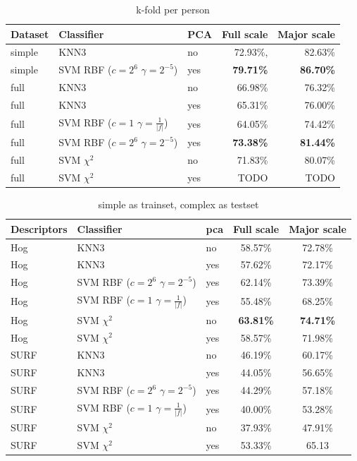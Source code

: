 \begin{table}
\centering
\begin{tabular}{lllrr}
\hline\hline
Dataset & Classifier & PCA	& Full scale	& Major scale \\
\hline
simple	& KNN3	&	no	& 72.93\%, & 82.63\% \\
simple	& SVM RBF ($c=2^6$ $\gamma=2^{-5}$) &	yes	& \textbf{79.71\%} & \textbf{86.70\%}	\\
\hline
full 	& KNN3 &	no	& 66.98\% & 76.32\%	\\
full 	& KNN3 &	yes	& 65.31\% & 76.00\%	\\
full 	& SVM RBF ($c=1$ $\gamma=\frac{1}{|f|}$) & yes	& 64.05\% & 74.42\%	\\
full 	& SVM RBF ($c=2^6$ $\gamma=2^{-5}$)	     & yes	& \textbf{73.38\%} & \textbf{81.44\%}	\\
full 	& SVM $\chi^2$ &	no	&  71.83\% &80.07\% \\
full 	& SVM $\chi^2$ &	yes	&  TODO & TODO \\
\hline
\end{tabular}
\caption{k-fold per person}
\label{tab:perperson}
\end{table}


\begin{table}
\centering
\begin{tabular}{lllcc}
\hline\hline
Descriptors & Classifier 		& pca		&  	Full scale	&	Major scale	\\
\hline
Hog & KNN3				& no	&	58.57\% 	&	72.78\%	\\
Hog & KNN3 				& yes	&	57.62\% 	&	72.17\%	\\
Hog & SVM RBF ($c=2^6$ $\gamma=2^{-5}$)			& yes & 62.14\%	&	73.39\%	\\
Hog & SVM RBF ($c=1$ $\gamma=\frac{1}{|f|}$)	& yes & 55.48\%	&	68.25\%	\\
Hog & SVM $\chi^2$ 		&	no	&	\textbf{63.81\%}		&	\textbf{74.71\%}	\\
Hog & SVM $\chi^2$		&	yes &	58.57\% 	&	71.98\% \\
\hline
SURF & KNN3				&	no	&	46.19\% 	&	60.17\%	\\
SURF & KNN3				&	yes &	44.05\%		& 56.65\% \\
SURF & SVM RBF ($c=2^6$ $\gamma=2^{-5}$)		& yes &	44.29\%	&	57.18\%	\\
SURF & SVM RBF ($c=1$ $\gamma=\frac{1}{|f|}$)	& yes &	40.00\%	&	53.28\%	\\
SURF & SVM $\chi^2$		&	no	&	37.93\%		&	47.91\%	\\
SURF & SVM $\chi^2$		&	yes	&	53.33\% 	&	65.13 \\
\hline
\end{tabular}
\caption{simple as trainset, complex as testset}
\label{tab:perset}
\end{table}


